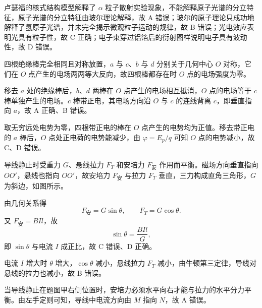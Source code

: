 
\begin{answer}
卢瑟福的核式结构模型解释了 $\alpha$ 粒子散射实验现象，不能解释原子光谱的分立特征，原子光谱的分立特征由玻尔理论解释，故 A 错误；玻尔的原子理论只成功地解释了氢原子光谱，并未完全揭示微观粒子运动的规律，故 B 错误；光电效应表明光具有粒子性，故 C 正确；电子束穿过铝箔后的衍射图样说明电子具有波动性，故 D 错误。
\end{answer}

\begin{answer}
四根绝缘棒完全相同且对称放置，$a$ 与 $c$、$b$ 与 $d$ 分别关于几何中心 $O$ 对称，它们在 $O$ 点产生的电场两两等大反向，故四根棒都存在时 $O$ 点的电场强度为零。

移去 $a$ 处的绝缘棒后，$b$、$d$ 两棒在 $O$ 点产生的电场相互抵消，$O$ 点的电场等于 $c$ 棒单独产生的电场。$c$ 棒带正电，其电场方向沿 $O$ 与 $c$ 的连线背离 $c$，即垂直指向 $a$，故 A 正确、B 错误。

取无穷远处电势为零，四根带正电的棒在 $O$ 点产生的电势均为正值。移去带正电的 $a$ 棒后，$O$ 点处正电荷的电势能减少，由 $\varphi=E_{p}/q$ 可知 $O$ 点的电势减小，故 C、D 错误。
\end{answer}

\begin{answer}
导线静止时受重力 $G$、悬线拉力 $F_{T}$ 和安培力 $F_{\text{安}}$ 作用而平衡。磁场方向垂直指向 $OO'$，悬线也指向 $OO'$，故安培力 $F_{\text{安}}$ 与拉力 $F_{T}$ 垂直，三力构成直角三角形，$G$ 为斜边，如图所示。


由几何关系得
\[
  F_{\text{安}}=G\sin\theta,\qquad F_{T}=G\cos\theta .
\]
又 $F_{\text{安}}=BIl$，故
\[
  \sin\theta=\frac{BIl}{G},
\]
即 $\sin\theta$ 与电流 $I$ 成正比，故 C 错误、D 正确。

电流 $I$ 增大时 $\theta$ 增大，$\cos\theta$ 减小，悬线拉力 $F_{T}$ 减小，由牛顿第三定律，导线对悬线的拉力也减小，故 B 错误。

当导线静止在题图甲右侧位置时，安培力必须水平向右才能与拉力的水平分力平衡。由左手定则可知，导线中电流方向由 $M$ 指向 $N$，故 A 错误。
\end{answer}

